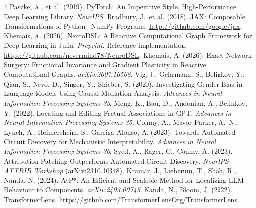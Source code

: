 \documentclass[11pt,a4paper]{article}
\begin{document}
\begin{thebibliography}{4}
 Paszke, A., et al. (2019). PyTorch: An Imperative Style, High-Performance Deep Learning Library. \emph{NeurIPS}.
 Bradbury, J., et al. (2018). JAX: Composable Transformations of Python+NumPy Programs. \url{http://github.com/google/jax}.
 Khemais, A. (2026). NeuroDSL: A Reactive Computational Graph Framework for Deep Learning in Julia. \emph{Preprint}. Reference implementation: \url{https://github.com/nevermind78/NeuroDSL}.
 Khemais, A. (2026). Exact Network Surgery: Functional Invariance and Gradient Plasticity in Reactive Computational Graphs. \emph{arXiv:2607.16568}.
 Vig, J., Gehrmann, S., Belinkov, Y., Qian, S., Nevo, D., Singer, Y., Shieber, S. (2020). Investigating Gender Bias in Language Models Using Causal Mediation Analysis. \emph{Advances in Neural Information Processing Systems 33}.
 Meng, K., Bau, D., Andonian, A., Belinkov, Y. (2022). Locating and Editing Factual Associations in GPT. \emph{Advances in Neural Information Processing Systems 35}.
 Conmy, A., Mavor-Parker, A.~N., Lynch, A., Heimersheim, S., Garriga-Alonso, A. (2023). Towards Automated Circuit Discovery for Mechanistic Interpretability. \emph{Advances in Neural Information Processing Systems 36}.
 Syed, A., Rager, C., Conmy, A. (2023). Attribution Patching Outperforms Automated Circuit Discovery. \emph{NeurIPS ATTRIB Workshop} (arXiv:2310.10348).
 Kram\'ar, J., Lieberum, T., Shah, R., Nanda, N. (2024). AtP*: An Efficient and Scalable Method for Localizing LLM Behaviour to Components. \emph{arXiv:2403.00745}.
 Nanda, N., Bloom, J. (2022). TransformerLens. \url{https://github.com/TransformerLensOrg/TransformerLens}.
\end{thebibliography}
\end{document}

